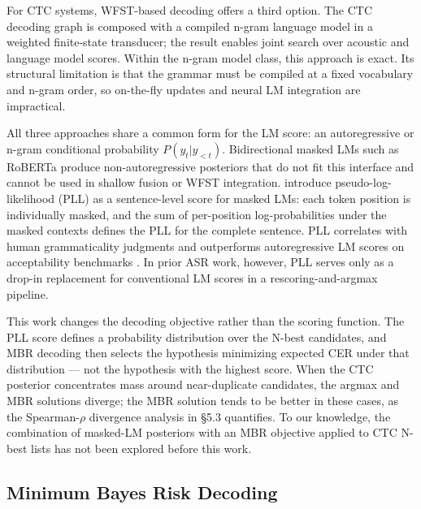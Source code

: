 For CTC systems, WFST-based decoding \cite{miao2015eesen} offers a third option. The CTC decoding graph is composed with a compiled n-gram language model in a weighted finite-state transducer; the result enables joint search over acoustic and language model scores. Within the n-gram model class, this approach is exact. Its structural limitation is that the grammar must be compiled at a fixed vocabulary and n-gram order, so on-the-fly updates and neural LM integration are impractical.

All three approaches share a common form for the LM score: an autoregressive or n-gram conditional probability $P(y_t | y_{<t})$. Bidirectional masked LMs such as RoBERTa \cite{liu2019roberta} produce non-autoregressive posteriors that do not fit this interface and cannot be used in shallow fusion or WFST integration. \citet{salazar2020pll} introduce pseudo-log-likelihood (PLL) as a sentence-level score for masked LMs: each token position is individually masked, and the sum of per-position log-probabilities under the masked contexts defines the PLL for the complete sentence. PLL correlates with human grammaticality judgments and outperforms autoregressive LM scores on acceptability benchmarks \cite{salazar2020pll}. In prior ASR work, however, PLL serves only as a drop-in replacement for conventional LM scores in a rescoring-and-argmax pipeline.

This work changes the decoding objective rather than the scoring function. The PLL score defines a probability distribution over the N-best candidates, and MBR decoding then selects the hypothesis minimizing expected CER under that distribution — not the hypothesis with the highest score. When the CTC posterior concentrates mass around near-duplicate candidates, the argmax and MBR solutions diverge; the MBR solution tends to be better in these cases, as the Spearman-$\rho$ divergence analysis in §5.3 quantifies. To our knowledge, the combination of masked-LM posteriors with an MBR objective applied to CTC N-best lists has not been explored before this work.



\subsection{Minimum Bayes Risk Decoding}


